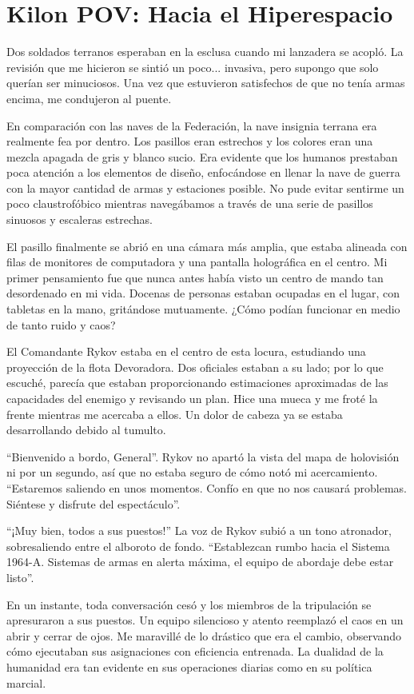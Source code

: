 \chapter{Kilon POV: Hacia el Hiperespacio}

Dos soldados terranos esperaban en la esclusa cuando mi lanzadera se acopló. La revisión que me hicieron se sintió un poco... invasiva, pero supongo que solo querían ser minuciosos. Una vez que estuvieron satisfechos de que no tenía armas encima, me condujeron al puente.

En comparación con las naves de la Federación, la nave insignia terrana era realmente fea por dentro. Los pasillos eran estrechos y los colores eran una mezcla apagada de gris y blanco sucio. Era evidente que los humanos prestaban poca atención a los elementos de diseño, enfocándose en llenar la nave de guerra con la mayor cantidad de armas y estaciones posible. No pude evitar sentirme un poco claustrofóbico mientras navegábamos a través de una serie de pasillos sinuosos y escaleras estrechas.

El pasillo finalmente se abrió en una cámara más amplia, que estaba alineada con filas de monitores de computadora y una pantalla holográfica en el centro. Mi primer pensamiento fue que nunca antes había visto un centro de mando tan desordenado en mi vida. Docenas de personas estaban ocupadas en el lugar, con tabletas en la mano, gritándose mutuamente. ¿Cómo podían funcionar en medio de tanto ruido y caos?

El Comandante Rykov estaba en el centro de esta locura, estudiando una proyección de la flota Devoradora. Dos oficiales estaban a su lado; por lo que escuché, parecía que estaban proporcionando estimaciones aproximadas de las capacidades del enemigo y revisando un plan. Hice una mueca y me froté la frente mientras me acercaba a ellos. Un dolor de cabeza ya se estaba desarrollando debido al tumulto.

“Bienvenido a bordo, General”. Rykov no apartó la vista del mapa de holovisión ni por un segundo, así que no estaba seguro de cómo notó mi acercamiento. ``Estaremos saliendo en unos momentos. Confío en que no nos causará problemas. Siéntese y disfrute del espectáculo''.

``¡Muy bien, todos a sus puestos!'' La voz de Rykov subió a un tono atronador, sobresaliendo entre el alboroto de fondo. ``Establezcan rumbo hacia el Sistema 1964-A. Sistemas de armas en alerta máxima, el equipo de abordaje debe estar listo''.

En un instante, toda conversación cesó y los miembros de la tripulación se apresuraron a sus puestos. Un equipo silencioso y atento reemplazó el caos en un abrir y cerrar de ojos. Me maravillé de lo drástico que era el cambio, observando cómo ejecutaban sus asignaciones con eficiencia entrenada. La dualidad de la humanidad era tan evidente en sus operaciones diarias como en su política marcial.

